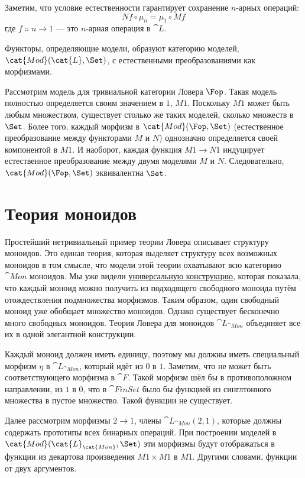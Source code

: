 Заметим, что условие естественности гарантирует сохранение
$n$-арных операций:
\[N f \circ \mu_n = \mu_1 \circ M f\]
где $f \Colon n \to 1$ — это $n$-арная операция в
$\cat{L}$.

Функторы, определяющие модели, образуют категорию моделей,
$\cat{Mod}(\cat{L}, \Set)$, с естественными преобразованиями как морфизмами.

Рассмотрим модель для тривиальной категории Ловера
$\Fop$. Такая модель полностью определяется своим
значением в $1$, $M 1$. Поскольку $M 1$ может быть любым
множеством, существует столько же таких моделей, сколько множеств в
$\Set$. Более того, каждый морфизм в $\cat{Mod}(\Fop, \Set)$ (естественное
преобразование между функторами $M$ и $N$)
однозначно определяется своей компонентой в $M 1$. И наоборот, каждая
функция $M 1 \to N 1$ индуцирует естественное
преобразование между двумя моделями $M$ и $N$.
Следовательно, $\cat{Mod}(\Fop, \Set)$ эквивалентна $\Set$.

\section{Теория моноидов}

Простейший нетривиальный пример теории Ловера описывает
структуру моноидов. Это единая теория, которая выделяет структуру
всех возможных моноидов в том смысле, что модели этой теории
охватывают всю категорию $\cat{Mon}$ моноидов. Мы уже видели
\hyperref[free-monoids]{универсальную
  конструкцию}, которая показала, что каждый моноид можно получить из подходящего
свободного моноида путём отождествления подмножества морфизмов. Таким образом,
один свободный моноид уже обобщает множество моноидов. Однако
существует бесконечно много свободных моноидов. Теория Ловера для
моноидов $\cat{L}_{\cat{Mon}}$ объединяет все их в одной
элегантной конструкции.

Каждый моноид должен иметь единицу, поэтому мы должны иметь специальный морфизм
$\eta$ в $\cat{L}_{\cat{Mon}}$, который идёт из $0$ в
$1$. Заметим, что не может быть соответствующего морфизма в
$\cat{F}$. Такой морфизм шёл бы в противоположном направлении, из
$1$ в $0$, что в $\cat{FinSet}$ было бы функцией
из синглтонного множества в пустое множество. Такой функции не существует.

Далее рассмотрим морфизмы $2 \to 1$, члены
$\cat{L}_{\cat{Mon}}(2, 1)$, которые должны содержать прототипы всех бинарных
операций. При построении моделей в $\cat{Mod}(\cat{L}_{\cat{Mon}}, \Set)$ эти
морфизмы будут отображаться в функции из декартова произведения
$M 1 \times M 1$ в $M 1$. Другими словами, функции от
двух аргументов.

